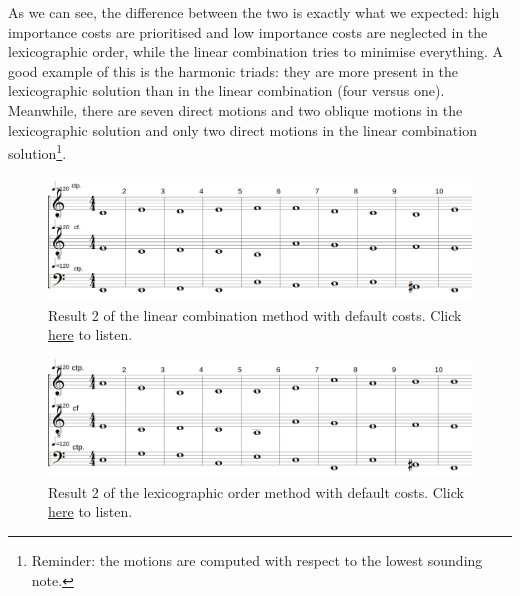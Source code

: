 As we can see, the difference between the two is exactly what we expected: high importance costs are prioritised and low importance costs are neglected in the lexicographic order, while the linear combination tries to minimise everything. A good example of this is the harmonic triads: they are more present in the lexicographic solution than in the linear combination (four versus one). Meanwhile, there are seven direct motions and two oblique motions in the lexicographic solution and only two direct motions in the linear combination solution\footnote{Reminder: the motions are computed with respect to the lowest sounding note.}.

\begin{figure}[h]
    \centering
    \includegraphics[width=1\textwidth]{Images/Experiments/linear-combination-1sp0.png}
    \caption{Result 2 of the linear combination method with default costs. Click \href{https://youtu.be/pnwceQyZd9E}{here} to listen.}
    \label{fig:combili-1sp0}
\end{figure}

\begin{figure}[h]
    \centering
    \includegraphics[width=1\textwidth]{Images/Experiments/basic-lexico-1sp0.png}
    \caption{Result 2 of the lexicographic order method with default costs. Click \href{https://youtu.be/-twWU-hNcYI}{here} to listen.}
    \label{fig:lexico-1sp0}
\end{figure}

